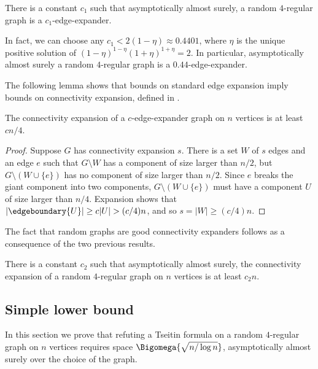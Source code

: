 %
%

\begin{theorem} \label{thm:expander}
There is a constant $c_1$ such that asymptotically almost surely, a random $4$-regular graph
is a $c_1$-edge-expander.
\end{theorem}

In fact, we can choose any $c_1 < 2(1-\eta) \approx 0.4401$, where $\eta$ is the unique positive solution of $(1-\eta)^{1-\eta} (1+\eta)^{1+\eta} = 2$. In particular, asymptotically almost surely a random $4$-regular graph is a $0.44$-edge-expander.

%
The following lemma shows that bounds on standard edge expansion imply bounds on connectivity expansion, defined in .

%
%
%
%
%
%

%
%
%
%
%
%
\begin{lemma} \label{lem:edge-to-connectivity}
  The connectivity expansion of a $c$-edge-expander graph on $n$ vertices is at least $cn/4$.
\end{lemma}
\begin{proof}
  Suppose $G$ has connectivity expansion $s$. There is a set $W$ of $s$ edges and an edge $e$ such that $G \setminus W$ has a component of size larger than $n/2$, but $G \setminus (W \cup \{e\})$ has no component of size larger than $n/2$. Since $e$ breaks the giant component into two components, $G \setminus (W \cup \{e\})$ must have a component $U$ of size larger than $n/4$. Expansion shows that
$|\edgeboundary{U}| \geq c |U| > (c/4) n$, and so $s = |W| \geq (c/4) n$.
\end{proof}

The fact that random graphs are good connectivity expanders follows as a consequence of the two previous results.
\begin{corollary}
\label{cor:splitting}
There is a constant $c_2$ such that asymptotically almost surely, the connectivity expansion
of a random $4$-regular graph on $n$ vertices is at least $c_2n$.
\end{corollary}

\subsection{Simple lower bound} \label{sec:simple}

In this section we prove that refuting a \Gnonsplitting Tseitin formula on a random $4$-regular graph on $n$ vertices requires space $\Bigomega{\sqrt{n/\log n}}$, asymptotically almost surely over the choice of the graph.

